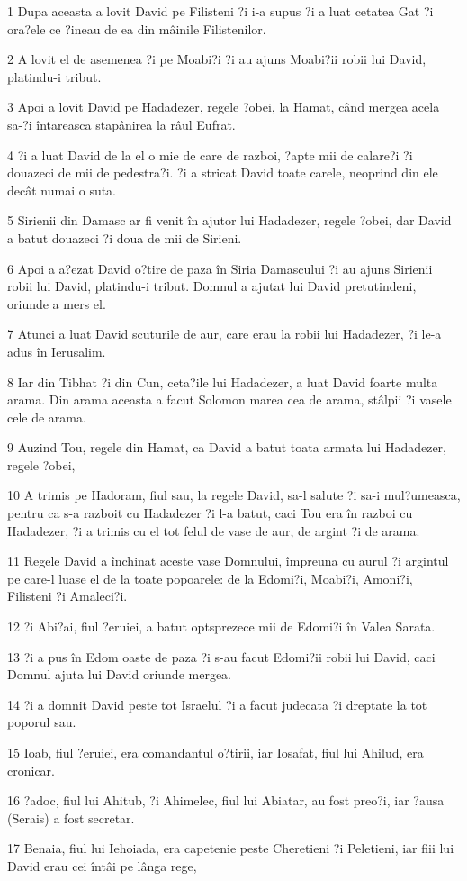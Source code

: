 \par 1 Dupa aceasta a lovit David pe Filisteni ?i i-a supus ?i a luat cetatea Gat ?i ora?ele ce ?ineau de ea din mâinile Filistenilor.
\par 2 A lovit el de asemenea ?i pe Moabi?i ?i au ajuns Moabi?ii robii lui David, platindu-i tribut.
\par 3 Apoi a lovit David pe Hadadezer, regele ?obei, la Hamat, când mergea acela sa-?i întareasca stapânirea la râul Eufrat.
\par 4 ?i a luat David de la el o mie de care de razboi, ?apte mii de calare?i ?i douazeci de mii de pedestra?i. ?i a stricat David toate carele, neoprind din ele decât numai o suta.
\par 5 Sirienii din Damasc ar fi venit în ajutor lui Hadadezer, regele ?obei, dar David a batut douazeci ?i doua de mii de Sirieni.
\par 6 Apoi a a?ezat David o?tire de paza în Siria Damascului ?i au ajuns Sirienii robii lui David, platindu-i tribut. Domnul a ajutat lui David pretutindeni, oriunde a mers el.
\par 7 Atunci a luat David scuturile de aur, care erau la robii lui Hadadezer, ?i le-a adus în Ierusalim.
\par 8 Iar din Tibhat ?i din Cun, ceta?ile lui Hadadezer, a luat David foarte multa arama. Din arama aceasta a facut Solomon marea cea de arama, stâlpii ?i vasele cele de arama.
\par 9 Auzind Tou, regele din Hamat, ca David a batut toata armata lui Hadadezer, regele ?obei,
\par 10 A trimis pe Hadoram, fiul sau, la regele David, sa-l salute ?i sa-i mul?umeasca, pentru ca s-a razboit cu Hadadezer ?i l-a batut, caci Tou era în razboi cu Hadadezer, ?i a trimis cu el tot felul de vase de aur, de argint ?i de arama.
\par 11 Regele David a închinat aceste vase Domnului, împreuna cu aurul ?i argintul pe care-l luase el de la toate popoarele: de la Edomi?i, Moabi?i, Amoni?i, Filisteni ?i Amaleci?i.
\par 12 ?i Abi?ai, fiul ?eruiei, a batut optsprezece mii de Edomi?i în Valea Sarata.
\par 13 ?i a pus în Edom oaste de paza ?i s-au facut Edomi?ii robii lui David, caci Domnul ajuta lui David oriunde mergea.
\par 14 ?i a domnit David peste tot Israelul ?i a facut judecata ?i dreptate la tot poporul sau.
\par 15 Ioab, fiul ?eruiei, era comandantul o?tirii, iar Iosafat, fiul lui Ahilud, era cronicar.
\par 16 ?adoc, fiul lui Ahitub, ?i Ahimelec, fiul lui Abiatar, au fost preo?i, iar ?ausa (Serais) a fost secretar.
\par 17 Benaia, fiul lui Iehoiada, era capetenie peste Cheretieni ?i Peletieni, iar fiii lui David erau cei întâi pe lânga rege,

